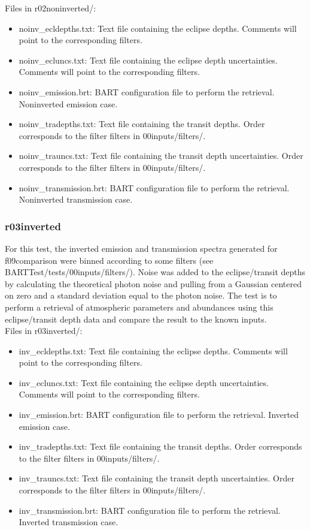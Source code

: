 \documentclass[letterpaper, 12pt]{article}
\begin{document}
Files in r02noninverted/:
\begin{itemize} \itemsep0pt
  \item noinv{\_}ecldepths.txt: Text file containing the eclipse depths. Comments 
        will point to the corresponding filters.
  \item noinv{\_}ecluncs.txt: Text file containing the eclipse depth 
        uncertainties. 
        Comments will point to the corresponding filters.
  \item noinv{\_}emission.brt: BART configuration file to perform the retrieval. 
        Noninverted emission case.
  \item noinv{\_}tradepths.txt: Text file containing the transit depths. Order 
        corresponds to the filter filters in 00inputs/filters/.
  \item noinv{\_}trauncs.txt: Text file containing the transit depth 
        uncertainties. 
        Order corresponds to the filter filters in 00inputs/filters/.
  \item noinv{\_}transmission.brt: BART configuration file to perform the 
        retrieval. Noninverted transmission case.
\end{itemize}

\subsubsection{r03inverted}
For this test, the inverted emission and transmission spectra generated for 
f09comparison were binned according to some filters (see 
BARTTest/tests/00inputs/filters/). Noise was added to the eclipse/transit 
depths by calculating the theoretical photon noise and pulling from a Gaussian 
centered on zero and a standard deviation equal to the photon noise. The test 
is to perform a retrieval of atmospheric parameters and abundances using this 
eclipse/transit depth data and compare the result to the known inputs.\\

Files in r03inverted/:
\begin{itemize} \itemsep0pt
  \item inv{\_}ecldepths.txt: Text file containing the eclipse depths. Comments 
        will point to the corresponding filters.
  \item inv{\_}ecluncs.txt: Text file containing the eclipse depth uncertainties. 
        Comments will point to the corresponding filters.
  \item inv{\_}emission.brt: BART configuration file to perform the retrieval. 
        Inverted emission case.
  \item inv{\_}tradepths.txt: Text file containing the transit depths. Order 
        corresponds to the filter filters in 00inputs/filters/.
  \item inv{\_}trauncs.txt: Text file containing the transit depth uncertainties. 
        Order corresponds to the filter filters in 00inputs/filters/.
  \item inv{\_}transmission.brt: BART configuration file to perform the 
        retrieval. Inverted transmission case.
\end{itemize}
\end{document}
